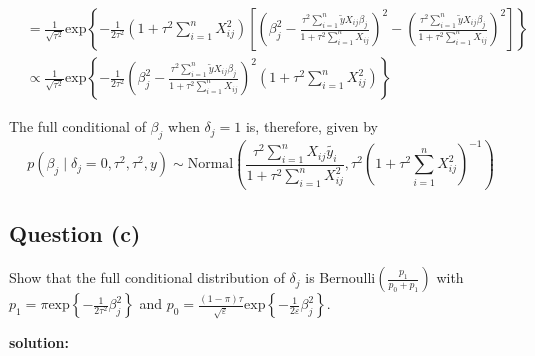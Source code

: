 \documentclass[
]{article}
\begin{document}
\begin{align*}
    &=    \frac{1}{\sqrt{\tau^2}}\text{exp}\left\{-\frac{1}{2\tau^2} \left(1 + \tau^2 \sum_{i=1}^nX_{ij}^2 \right)\left[\left( \beta_j^2 - \frac{\tau^2\sum_{i=1}^n\tilde{y}X_{ij}\beta_j}{1+\tau^2\sum_{i=1}^nX_{ij}}\right)^2 - \left(\frac{\tau^2\sum_{i=1}^n\tilde{y}X_{ij}\beta_j}{1+\tau^2\sum_{i=1}^nX_{ij}} \right)^2\right] \right\} \\
    &\propto    \frac{1}{\sqrt{\tau^2}}\text{exp}\left\{-\frac{1}{2\tau^2} \left( \beta_j^2 - \frac{\tau^2\sum_{i=1}^n\tilde{y}X_{ij}\beta_j}{1+\tau^2\sum_{i=1}^nX_{ij}}\right)^2 \left(1 + \tau^2 \sum_{i=1}^nX_{ij}^2 \right) \right\} 
\end{align*}

The full conditional of \(\beta_j\) when \(\delta_j=1\) is, therefore,
given by
\[p(\beta_j \mid \delta_j=0, \tau^2, \tau^2,y) \sim \text{Normal}\left(\frac{\tau^2\sum_{i=1}^n X_{ij}\tilde{y_i}}{1+\tau^2\sum_{i=1}^nX_{ij}^2}, \tau^2\left(1 + \tau^2\sum_{i=1}^nX_{ij}^2 \right)^{-1} \right)\]

\hypertarget{question-c}{%
\subsection{Question (c)}\label{question-c}}

Show that the full conditional distribution of \(\delta_j\) is
Bernoulli\(\displaystyle \left(\frac{p_1}{p_0 + p_1} \right)\) with
\(p_1 = \pi\text{exp}\left\{-\frac{1}{2\tau^2}\beta_j^2 \right\}\) and
\(\displaystyle p_0 = \frac{(1-\pi)\tau}{\sqrt{\varepsilon}} \text{exp}\left\{-\frac{1}{2\varepsilon} \beta_j^2 \right\}\).

\textbf{solution:}
\end{document}
